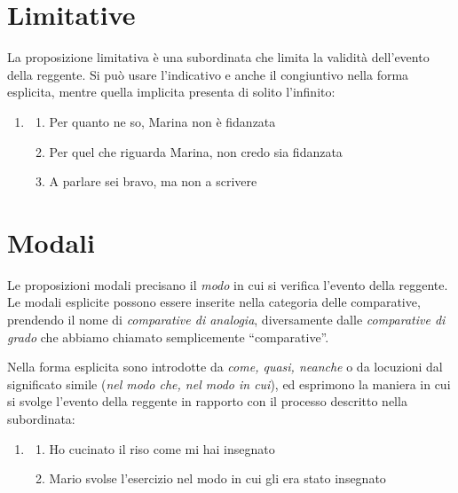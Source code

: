 \documentclass[
  a4paper,
  twoside,
  11pt,
  chapterprefix=false,
  bibliography=totocnumbered,
  listof=flat]{scrbook}
\providecommand{\tightlist}{%
  \setlength{\itemsep}{0pt}\setlength{\parskip}{0pt}}
\begin{document}
\hypertarget{limitative}{%
\section{Limitative}\label{limitative}}

La proposizione limitativa è una subordinata che limita la validità dell'evento della reggente. Si può usare l'indicativo e anche il congiuntivo nella forma esplicita, mentre quella implicita presenta di solito l'infinito:

\begin{enumerate}
\def\labelenumi{(\arabic{enumi})}
\setcounter{enumi}{103}
\item
  \begin{enumerate}
  \def\labelenumii{\alph{enumii}.}
  \tightlist
  \item
    Per quanto ne so, Marina non è fidanzata
  \item
    Per quel che riguarda Marina, non credo sia fidanzata
  \item
    A parlare sei bravo, ma non a scrivere
  \end{enumerate}
\end{enumerate}

\hypertarget{modali}{%
\section{Modali}\label{modali}}

Le proposizioni modali precisano il \emph{modo} in cui si verifica l'evento della reggente. Le modali esplicite possono essere inserite nella categoria delle comparative, prendendo il nome di \emph{comparative di analogia}, diversamente dalle \emph{comparative di grado} che abbiamo chiamato semplicemente \enquote{comparative}.

Nella forma esplicita sono introdotte da \emph{come, quasi, neanche} o da locuzioni dal significato simile (\emph{nel modo che, nel modo in cui}), ed esprimono la maniera in cui si svolge l'evento della reggente in rapporto con il processo descritto nella subordinata:

\begin{enumerate}
\def\labelenumi{(\arabic{enumi})}
\setcounter{enumi}{104}
\item
  \begin{enumerate}
  \def\labelenumii{\alph{enumii}.}
  \tightlist
  \item
    Ho cucinato il riso come mi hai insegnato
  \item
    Mario svolse l'esercizio nel modo in cui gli era stato insegnato
  \end{enumerate}
\end{enumerate}
\end{document}
